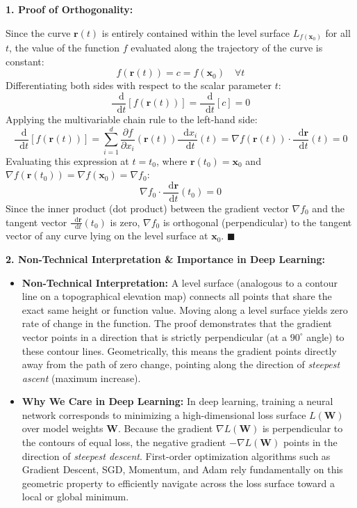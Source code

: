 \documentclass[11pt,english]{article}
\newcommand{\diff}{\mathop{}\!\mathrm{d}}
\begin{document}
\begin{enumerate}
\textbf{1. Proof of Orthogonality:}

Since the curve $\mathbf{r}(t)$ is entirely contained within the level surface $L_{f(\mathbf{x}_0)}$ for all $t$, the value of the function $f$ evaluated along the trajectory of the curve is constant:
\begin{equation}
    f(\mathbf{r}(t)) = c = f(\mathbf{x}_0) \quad \forall t
\end{equation}
Differentiating both sides with respect to the scalar parameter $t$:
\begin{equation}
    \frac{\diff}{\diff t} \left[ f(\mathbf{r}(t)) \right] = \frac{\diff}{\diff t}[c] = 0
\end{equation}
Applying the multivariable chain rule to the left-hand side:
\begin{equation}
    \frac{\diff}{\diff t} \left[ f(\mathbf{r}(t)) \right] = \sum_{i=1}^d \frac{\partial f}{\partial x_i}(\mathbf{r}(t)) \frac{\diff x_i}{\diff t}(t) = \nabla f(\mathbf{r}(t)) \cdot \frac{\diff \mathbf{r}}{\diff t}(t) = 0
\end{equation}
Evaluating this expression at $t = t_0$, where $\mathbf{r}(t_0) = \mathbf{x}_0$ and $\nabla f(\mathbf{r}(t_0)) = \nabla f(\mathbf{x}_0) = \nabla f_0$:
\begin{equation}
    \nabla f_0 \cdot \frac{\diff \mathbf{r}}{\diff t}(t_0) = 0
\end{equation}
Since the inner product (dot product) between the gradient vector $\nabla f_0$ and the tangent vector $\frac{\diff \mathbf{r}}{\diff t}(t_0)$ is zero, $\nabla f_0$ is orthogonal (perpendicular) to the tangent vector of any curve lying on the level surface at $\mathbf{x}_0$. $\blacksquare$

\vspace{0.5em}
\textbf{2. Non-Technical Interpretation \& Importance in Deep Learning:}

\begin{itemize}
    \item \textbf{Non-Technical Interpretation:} A level surface (analogous to a contour line on a topographical elevation map) connects all points that share the exact same height or function value. Moving along a level surface yields zero rate of change in the function. The proof demonstrates that the gradient vector points in a direction that is strictly perpendicular (at a $90^\circ$ angle) to these contour lines. Geometrically, this means the gradient points directly away from the path of zero change, pointing along the direction of \emph{steepest ascent} (maximum increase).
    \item \textbf{Why We Care in Deep Learning:} In deep learning, training a neural network corresponds to minimizing a high-dimensional loss surface $L(\mathbf{W})$ over model weights $\mathbf{W}$. Because the gradient $\nabla L(\mathbf{W})$ is perpendicular to the contours of equal loss, the negative gradient $-\nabla L(\mathbf{W})$ points in the direction of \emph{steepest descent}. First-order optimization algorithms such as Gradient Descent, SGD, Momentum, and Adam rely fundamentally on this geometric property to efficiently navigate across the loss surface toward a local or global minimum.
\end{itemize}


\end{enumerate}
\end{document}

